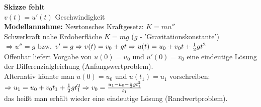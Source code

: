 \begin{beispiel}
\textbf{Skizze fehlt}\\

$v(t) = u'(t) $ Geschwindigkeit\\

\textbf{Modellannahme:} Newtonsches Kraftgesetz: $K = m u'' $\\
Schwerkraft nahe Erdoberfläche $K = mg$ ($g$ - 'Gravitationskonstante')\\
$\Rightarrow u'' = g $ bzw. $v' = g \\
\Rightarrow v(t) = v_0 + gt \\
\Rightarrow u(t) = u_0 + v_0 t + \frac{1}{2} g t^2 $\\
Offenbar liefert Vorgabe von $u(0) = u_0 $ und $u'(0) = v_0 $ eine eindeutige Lösung
der Differenzialgleichung (Anfangswertproblem).\\
Alternativ könnte man $u(0) = u_0 $ und $u(t_1) = u_1 $ vorschreiben:\\
$\Rightarrow u_1 = u_0 + v_0 t_1 + \frac{1}{2} g t_1^2 \\
\Rightarrow v_0 = \frac{u_1 - u_0 - \frac{1}{2} g t_1^2}{t_1} $\\
das heißt man erhält wieder eine eindeutige Lösung (Randwertproblem).
\end{beispiel}


